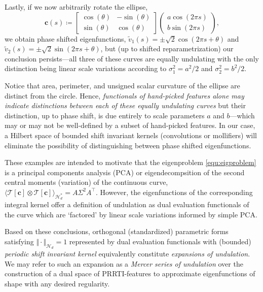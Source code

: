 \documentclass[pdflatex,iicol]{sn-jnl}%
\theoremstyle{thmstyleone}%
\theoremstyle{thmstyletwo}%
\theoremstyle{thmstylethree}%
\begin{document}
Lastly, if we now arbitrarily rotate the ellipse,
\begin{equation}
    \boldsymbol{c}(s) \coloneqq \left[ \begin{matrix}
    \cos(\theta) & -\sin(\theta)\\
    \sin(\theta) & \cos(\theta)
    \end{matrix}\right]\left(\begin{matrix}
        a\cos (2\pi s)\\
        b\sin (2\pi s)
    \end{matrix}\right),
\end{equation}
we obtain phase shifted eigenfunctions, $\widetilde{v}_1(s) = \pm\sqrt{2}\cos(2\pi s + \theta)$ and $\widetilde{v}_2(s) = \pm \sqrt{2}\sin(2\pi s + \theta)$, but (up to shifted reparametrization) our conclusion persists---all three of these curves are equally undulating with the only distinction being linear scale variations according to $\sigma_1^2 = a^2/2$ and $\sigma_2^2 = b^2/2$. 

Notice that area, perimeter, and unsigned scalar curvature of the ellipse are distinct from the circle. Hence, \emph{functionals of hand-picked features alone may indicate distinctions between each of these equally undulating curves} but their distinction, up to phase shift, is due entirely to scale parameters $a$ and $b$---which may or may not be well-defined by a subset of hand-picked features. In our case, a Hilbert space of bounded shift invariant kernels (convolutions or mollifiers) will eliminate the possibility of distinguishing between phase shifted eigenfunctions.

These examples are intended to motivate that the eigenproblem \eqref{equ:eigproblem} is a principal components analysis (PCA) or eigendecompsition of the second central moments (variation) of the continuous curve,
$
\langle \mathcal{T}[\boldsymbol{c}] \otimes \mathcal{T}[\boldsymbol{c}]\rangle_{\mathcal{H}^*_d} = A\Sigma^2 A^{\top}.
$
However, the eigenfunctions of the corresponding integral kernel offer a definition of undulation as dual evaluation functionals of the curve which are `factored' by linear scale variations informed by simple PCA. 

Based on these conclusions, orthogonal (standardized) parametric forms satisfying $\Vert \cdot \Vert_{\mathcal{H}_d} = 1$ represented by dual evaluation functionals with (bounded) \emph{periodic shift invariant kernel} equivalently constitute \emph{expansions of undulation}. We may refer to such an expansion as a \emph{Mercer series of undulation} over the construction of a dual space of PRRTI-features to approximate eigenfunctions of shape with any desired regularity.
\end{document}

